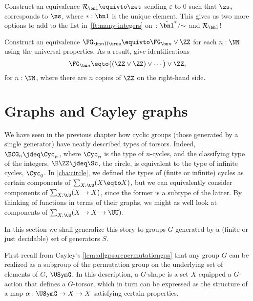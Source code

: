 \begin{xca}
  Construct an equivalence $\mathcal R_{\bn 1} \equivto \zet$
  sending $\varepsilon$ to $0$ such that $\zs_*$ corresponds to $\zs$,
  where $*:\bn 1$ is the unique element.
  This gives us two more options to add to the list in~\cref{ft:many-integers}
  on~: $\tilde{\bn 1}^*/{\sim}$ and $\mathcal R_{\bn 1}$!
\end{xca}

\begin{xca}
  Construct an equivalence $\FG_{\bn n \amalg \true} \equivto \FG_{\bn n}
  \vee \ZZ$ for each $n : \NN$ using the universal properties.
  As a result, give identifications
  \[
    \FG_{\bn n} \eqto \bigl((\ZZ \vee \ZZ) \vee \cdots\bigr) \vee \ZZ,
  \]
  for $n:\NN$, where there are $n$ copies of $\ZZ$ on the right-hand side.
\end{xca}

\section{Graphs and Cayley graphs}
\label{sec:cayley-graphs}

We have seen in the previous chapter how cyclic groups
(those generated by a single generator)
have neatly described types of torsors.
Indeed, $\BCG_n \jdeq \Cyc_n$, where $\Cyc_n$ is the type of $n$-cycles,
and the classifying type of the integers, $\B\ZZ\jdeq\Sc$, \ie the circle,
is equivalent to the type of infinite cycles, $\Cyc_0$.
In \cref{cha:circle}, we defined the types of (finite or infinite)
cycles as certain components of $\sum_{X:\UU}(X\eqto X)$,
but we can equivalently consider components of $\sum_{X:\UU}(X\to X)$,
since the former is a subtype of the latter.
By thinking of functions in terms of their graphs,
we might as well look at components of $\sum_{X:\UU}(X \to X \to \UU)$.

In this section we shall generalize this story
to groups $G$ generated by a
(finite or just decidable)
set of generators $S$.

First recall from Cayley's \cref{lem:allgpsarepermutationgps}
that any group $G$ can be realized as a subgroup of the permutation group
on the underlying set of elements of $G$, $\USymG$.
In this description, a $G$-shape is a set $X$ equipped
a $G$-action that defines a $G$-torsor,
which in turn can be expressed as the structure of a map $\alpha:\USymG \to X \to X$
satisfying certain properties.

